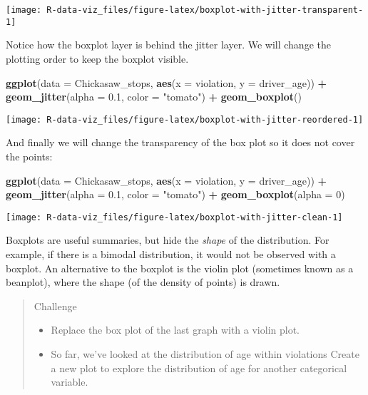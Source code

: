 \documentclass[]{book}
\newenvironment{Shaded}{\begin{snugshade}}{\end{snugshade}}
\newcommand{\KeywordTok}[1]{\textcolor[rgb]{0.13,0.29,0.53}{\textbf{#1}}}
\newcommand{\DataTypeTok}[1]{\textcolor[rgb]{0.13,0.29,0.53}{#1}}
\newcommand{\DecValTok}[1]{\textcolor[rgb]{0.00,0.00,0.81}{#1}}
\newcommand{\FloatTok}[1]{\textcolor[rgb]{0.00,0.00,0.81}{#1}}
\newcommand{\StringTok}[1]{\textcolor[rgb]{0.31,0.60,0.02}{#1}}
\newcommand{\OperatorTok}[1]{\textcolor[rgb]{0.81,0.36,0.00}{\textbf{#1}}}
\newcommand{\NormalTok}[1]{#1}
\theoremstyle{definition}
\theoremstyle{definition}
\theoremstyle{definition}
\theoremstyle{remark}
\begin{document}
\texttt{[image: R-data-viz\_files/figure-latex/boxplot-with-jitter-transparent-1]}

Notice how the boxplot layer is behind the jitter layer. We will change
the plotting order to keep the boxplot visible.

\begin{Shaded}
\begin{Highlighting}[]
\KeywordTok{ggplot}\NormalTok{(}\DataTypeTok{data =}\NormalTok{ Chickasaw_stops, }\KeywordTok{aes}\NormalTok{(}\DataTypeTok{x =}\NormalTok{ violation, }\DataTypeTok{y =}\NormalTok{ driver_age)) }\OperatorTok{+}
\StringTok{    }\KeywordTok{geom_jitter}\NormalTok{(}\DataTypeTok{alpha =} \FloatTok{0.1}\NormalTok{, }\DataTypeTok{color =} \StringTok{"tomato"}\NormalTok{) }\OperatorTok{+}\StringTok{ }
\StringTok{    }\KeywordTok{geom_boxplot}\NormalTok{()}
\end{Highlighting}
\end{Shaded}

\texttt{[image: R-data-viz\_files/figure-latex/boxplot-with-jitter-reordered-1]}

And finally we will change the transparency of the box plot so it does
not cover the points:

\begin{Shaded}
\begin{Highlighting}[]
\KeywordTok{ggplot}\NormalTok{(}\DataTypeTok{data =}\NormalTok{ Chickasaw_stops, }\KeywordTok{aes}\NormalTok{(}\DataTypeTok{x =}\NormalTok{ violation, }\DataTypeTok{y =}\NormalTok{ driver_age)) }\OperatorTok{+}
\StringTok{    }\KeywordTok{geom_jitter}\NormalTok{(}\DataTypeTok{alpha =} \FloatTok{0.1}\NormalTok{, }\DataTypeTok{color =} \StringTok{"tomato"}\NormalTok{) }\OperatorTok{+}
\StringTok{    }\KeywordTok{geom_boxplot}\NormalTok{(}\DataTypeTok{alpha =} \DecValTok{0}\NormalTok{)  }
\end{Highlighting}
\end{Shaded}

\texttt{[image: R-data-viz\_files/figure-latex/boxplot-with-jitter-clean-1]}

Boxplots are useful summaries, but hide the \emph{shape} of the
distribution. For example, if there is a bimodal distribution, it would
not be observed with a boxplot. An alternative to the boxplot is the
violin plot (sometimes known as a beanplot), where the shape (of the
density of points) is drawn.

\begin{quote}
Challenge

\begin{itemize}
\item
  Replace the box plot of the last graph with a violin plot.
\item
  So far, we've looked at the distribution of age within violations
  Create a new plot to explore the distribution of age for another
  categorical variable.
\end{itemize}
\end{quote}
\end{document}
